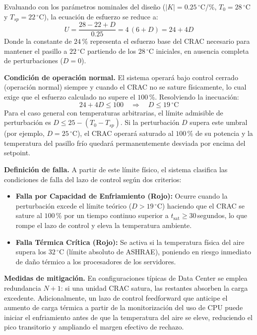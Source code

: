 \documentclass[journal,twocolumn]{IEEEtran}
\begin{document}
Evaluando con los parámetros nominales del diseño ($|K| = 0.25$\,$^\circ$C/\%, $T_0 = 28$\,$^\circ$C y $T_{sp} = 22$\,$^\circ$C), la ecuación de esfuerzo se reduce a:
\begin{equation}
    U = \frac{28 - 22 + D}{0.25} = 4\,(6 + D) = 24 + 4D
\end{equation}
Donde la constante de $24$\,\% representa el esfuerzo base del CRAC necesario para mantener el pasillo a $22$\,$^\circ$C partiendo de los $28$\,$^\circ$C iniciales, en ausencia completa de perturbaciones ($D = 0$).

\textbf{Condición de operación normal.} El sistema operará bajo control cerrado (operación normal) siempre y cuando el CRAC no se sature físicamente, lo cual exige que el esfuerzo calculado no supere el $100$\,\%. Resolviendo la inecuación:
\begin{equation}
    24 + 4D \le 100 \quad\Longrightarrow\quad D \le 19\,^\circ\text{C}
\end{equation}
Para el caso general con temperaturas arbitrarias, el límite admisible de perturbación es $D \le 25 - (T_0 - T_{sp})$. Si la perturbación $D$ supera este umbral (por ejemplo, $D = 25$\,$^\circ$C), el CRAC operará saturado al $100$\,\% de su potencia y la temperatura del pasillo frío quedará permanentemente desviada por encima del setpoint.

\textbf{Definición de falla.} A partir de este límite físico, el sistema clasifica las condiciones de falla del lazo de control según dos criterios:
\begin{itemize}
    \item \textbf{Falla por Capacidad de Enfriamiento (Rojo):} Ocurre cuando la perturbación excede el límite teórico ($D > 19$\,$^\circ$C) haciendo que el CRAC se sature al $100$\,\% por un tiempo continuo superior a $t_{\text{sat}} \ge 30$\,segundos, lo que rompe el lazo de control y eleva la temperatura ambiente.
    \item \textbf{Falla Térmica Crítica (Rojo):} Se activa si la temperatura física del aire supera los $32$\,$^\circ$C (límite absoluto de ASHRAE), poniendo en riesgo inmediato de daño térmico a los procesadores de los servidores.
\end{itemize}

\textbf{Medidas de mitigación.} En configuraciones típicas de Data Center se emplea redundancia $N+1$: si una unidad CRAC satura, las restantes absorben la carga excedente. Adicionalmente, un lazo de control feedforward que anticipe el aumento de carga térmica a partir de la monitorización del uso de CPU puede iniciar el enfriamiento antes de que la temperatura del aire se eleve, reduciendo el pico transitorio y ampliando el margen efectivo de rechazo.
\end{document}
